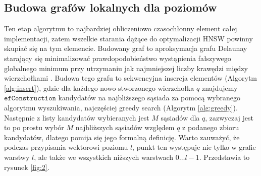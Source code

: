 \documentclass[twocolumn]{article}
\begin{document}
\subsection{Budowa grafów lokalnych dla poziomów}
Ten etap algorytmu to najbardziej obliczeniowo czasochłonny element całej implementacji, zatem wszelkie starania dążące do optymalizacji HNSW powinny skupiać się na tym elemencie.
Budowany graf to aproksymacja grafu Delaunay starający się minimalizować prawdopodobieństwo wystąpienia fałszywego globalnego minimum przy utrzymaniu jak najmniejszej liczby krawędzi między wierzchołkami \cite{Malkov2013}. Budowa tego grafu to sekwencyjna insercja elementów (Algorytm \ref{alg:insert}), gdzie dla każdego nowo stworzonego wierzchołka $q$ znajdujemy $\texttt{efConstruction}$ kandydatów na najbliższego sąsiada za pomocą wybranego algorytmu wyszukiwania, najczęściej greedy search (Algorytm \ref{alg:greedy}). Następnie z listy kandydatów wybieranych jest $M$ sąsiadów dla $q$, zazwyczaj jest to po prostu wybór $M$ najbliższych sąsiadów względem $q$ z podanego zbioru kandydatów, dlatego pomija się jego formalną definicję.
\newline
Warto zauważyć, że podczas przypisania wektorowi poziomu $l$, punkt ten występuje nie tylko w grafie warstwy $l$, ale także we wszystkich niższych warstwach $0\dots l-1$. Przedstawia to rysunek \ref{fig:2}.
\newpage
\end{document}
